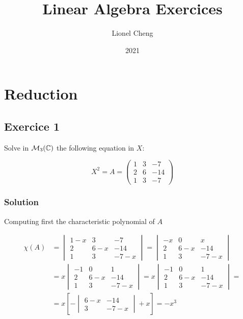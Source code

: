 \documentclass[11pt]{article}
\author{Lionel Cheng}
\date{2021}
\begin{document}
\title{Linear Algebra Exercices}
\maketitle

\section{Reduction}

\subsection{Exercice 1}

Solve in $\mathcal{M}_3(\mathbb{C})$ the following equation in $X$:

\begin{equation}
    X^2 = A = \begin{pmatrix}
        1 & 3 & - 7 \\
        2 & 6 & - 14 \\
        1 & 3 & - 7
    \end{pmatrix}
\end{equation}

\subsubsection{Solution}

Computing first the characteristic polynomial of $A$

\begin{align}
    \chi(A) &= \begin{vmatrix}
    1 - x & 3 & - 7 \\
    2 & 6 - x & - 14 \\
    1 & 3 & - 7 - x
    \end{vmatrix} = \begin{vmatrix}
    - x & 0 & x \\
    2 & 6 - x & - 14 \\
    1 & 3 & - 7 - x
    \end{vmatrix} \\ &= x \begin{vmatrix}
    - 1 & 0 & 1 \\
    2 & 6 - x & - 14 \\
    1 & 3 & - 7 - x
    \end{vmatrix} = x \begin{vmatrix}
    - 1 & 0 & 1 \\
    2 & 6 - x & - 14 \\
    1 & 3 & - 7 - x
    \end{vmatrix} = \\
    &= x \left[-\begin{vmatrix}
    6 - x & - 14 \\
    3 & - 7 - x 
    \end{vmatrix} + x \right] = - x^3
\end{align}
\end{document}
